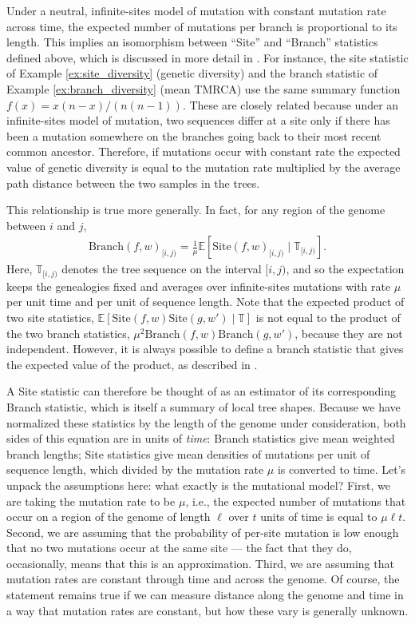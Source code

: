 \documentclass[9pt,twoside,lineno]{gsajnl}
\newcommand{\E}{\mathbb{E}}
\newcommand{\branch}{\mbox{Branch}} %
\newcommand{\site}{\mbox{Site}} %
\newcommand{\given}{\;\vert\;}
\newcommand{\treeseq}{\mathbb{T}} %
\newcommand{\iw}{w} %
\begin{document}
Under a neutral, infinite-sites model of mutation with constant mutation rate across time,
the expected number of mutations per branch is proportional to its length.
This implies an isomorphism between ``Site'' and ``Branch'' statistics defined above,
which is discussed in more detail in \citet{ralph2019empirical}.
For instance, the site statistic of Example \ref{ex:site_diversity} (genetic diversity)
and the branch statistic of Example \ref{ex:branch_diversity} (mean TMRCA)
use the same summary function $f(x) = x(n-x)/\left(n(n-1)\right)$.
These are closely related because under an infinite-sites model of mutation,
two sequences differ at a site only if there has been a mutation somewhere on the branches going back
to their most recent common ancestor.
Therefore, if mutations occur with constant rate
the expected value of genetic diversity
is equal to the mutation rate multiplied by the average path distance between
the two samples in the trees.

This relationship is true more generally.
In fact, for any region of the genome between $i$ and $j$,
\begin{align}
    \branch(f, \iw)_{[i,j)}
    =
    \frac{1}{\mu}
    \E\left[ \site(f, \iw)_{[i,j)} \given \treeseq_{[i,j)} \right].
\end{align}
Here, $\treeseq_{[i,j)}$ denotes the tree sequence on the interval $[i,j)$,
and so the expectation keeps the genealogies fixed
and averages over infinite-sites mutations
with rate $\mu$ per unit time and per unit of sequence length.
Note that the expected product of two site statistics,
$\E[\site(f, \iw) \site(g, \iw') \given \treeseq]$
is not equal to the product of the two branch statistics, $\mu^2 \branch(f, \iw) \branch(g, \iw')$,
because they are not independent.
However, it is always possible to define a branch statistic that
gives the expected value of the product, as described in \citet{ralph2019empirical}.

A Site statistic can therefore be thought of as an estimator of its corresponding Branch statistic,
which is itself a summary of local tree shapes.
Because we have normalized these statistics by the length of the genome under consideration,
both sides of this equation are in units of \emph{time}:
Branch statistics give mean weighted branch lengths;
Site statistics give mean densities of mutations per unit of sequence length,
which divided by the mutation rate $\mu$ is converted to time.
Let's unpack the assumptions here: what exactly is the mutational model?
First, we are taking the mutation rate to be $\mu$, i.e.,
the expected number of mutations that occur on a region of the genome of length $\ell$
over $t$ units of time is equal to $\mu \ell t$.
Second, we are assuming that the probability of per-site mutation is low enough
that no two mutations occur at the same site
--- the fact that they do, occasionally, means that this is an approximation.
Third, we are assuming that mutation rates are constant through time and across the genome.
Of course, the statement remains true if we can measure distance along the genome and time
in a way that mutation rates are constant, but how these vary is generally unknown.
\end{document}
